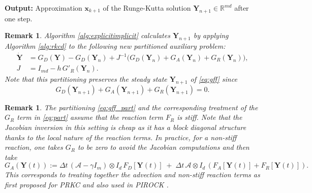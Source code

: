 \documentclass[10pt,a4paper]{article}
\newtheorem{remark}[theorem]{Remark}
\def \calA{\mathcal{A}}
\begin{document}
\begin{algorithm}
\vspace{0.1cm}

\textbf{Output: } 
Approximation ${\boldsymbol{x}}_{k+1}$ of the Runge-Kutta solution ${\boldsymbol{Y}}_{n+1}\in\mathbb{R}^{md}$ after one step. 

\label{alg:explicitimplicit}
\end{algorithm}




\begin{remark}
Algorithm \ref{alg:explicitimplicit} 
calculates
 $\boldsymbol{Y}_{n+1}$ by applying  Algorithm \ref{alg:rkcd}  to the following new partitioned auxiliary problem:
\begin{align} \label{eq:part}
\dot{\boldsymbol{Y}}
&= G_D(\boldsymbol{Y}) - G_D(\boldsymbol{Y}_n)
+ J^{-1}\!\bigl(G_D(\boldsymbol{Y}_n)+G_A(\boldsymbol{Y}_n)+G_R(\boldsymbol{Y}_n)\bigr),
\\
J &= I_{md} - h\, G'_R(\boldsymbol{Y}_n).
\end{align}
Note that this partitioning preserves the steady state ${\boldsymbol{Y}}_{n+1}$ of \eqref{eq:gff} since 
\[
G_{D}({\boldsymbol{Y}}_{n+1})+G_{A}({\boldsymbol{Y}}_{n+1})+G_{R}({\boldsymbol{Y}}_{n+1})=0.
\]
\end{remark}

\begin{remark}
The partitioning \eqref{eq:gff_part} and the corresponding treatment of the $G_{R}$ term in \eqref{eq:part} assume that the reaction term $F_{R}$ is stiff. Note that the Jacobian inversion in this setting is cheap as it has a block diagonal structure thanks to the local nature of the reaction terms.  In practice, for a non-stiff reaction, one takes $G_{R}$ to be zero to avoid the Jacobian computations and then take \[G_{A}(\boldsymbol{Y}(t)):=\Delta t\, (\calA-\gamma I_m)\otimes I_d \, F_D[ {\boldsymbol{Y}}(t)] \;+\; \Delta t\, \calA\otimes I_d \, \left(F_A[{\boldsymbol{Y}}(t)]+ F_R[ {\boldsymbol{Y}}(t)]\right).
\]
This corresponds to treating together the advection and non-stiff reaction terms as first proposed for PRKC \cite{Zb11} and also used in PIROCK \cite{AV13}.
\end{remark}
\end{document}
